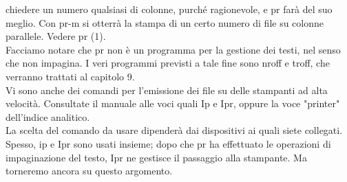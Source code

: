 chiedere un numero qualsiasi di colonne, purché ragionevole, e pr farà del suo meglio.
 Con pr-m si otterrà la stampa di un certo numero di file su colonne parallele. Vedere
  pr (1).\\
Facciamo notare che pr non è un programma per la gestione dei testi, nel senso che
non impagina. I veri programmi previsti a tale fine sono nroff e troff, che verranno
trattati al capitolo 9.\\
Vi sono anche dei comandi per l'emissione dei file su delle stampanti ad alta velocità.
 Consultate il manuale alle voci quali Ip e Ipr, oppure la voce "printer" dell'indice analitico. \\
 La scelta del comando da usare dipenderà dai dispositivi ai quali siete collegati. Spesso, 
 ip e Ipr sono usati insieme; dopo che pr ha effettuato le operazioni di impaginazione del
  testo, Ipr ne gestisce il passaggio alla stampante. Ma torneremo ancora su questo argomento.
